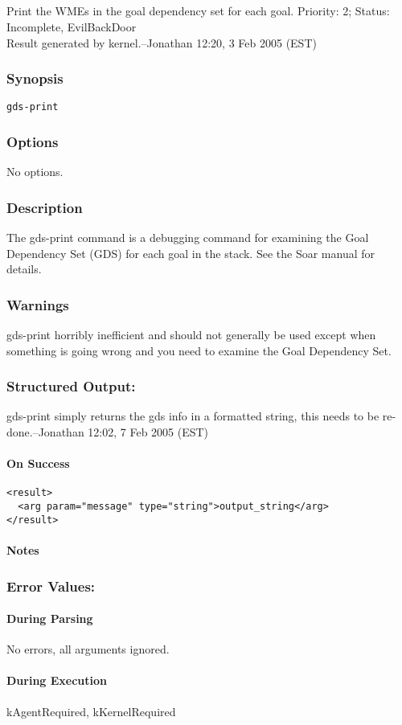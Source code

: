 \subsection{}
\label{gds-print}
Print the WMEs in the goal dependency set for each goal. 
 Priority: 2; Status: Incomplete, EvilBackDoor\\ 
Result generated by kernel.--Jonathan 12:20, 3 Feb 2005 (EST) 
\subsubsection*{Synopsis}
\begin{verbatim}
gds-print
\end{verbatim}
\subsubsection*{Options}
 No options. 
\subsubsection*{Description}
 The gds-print command is a debugging command for examining the Goal Dependency Set (GDS) for each goal in the stack. See the Soar manual for details. 
\subsubsection*{Warnings}
 gds-print horribly inefficient and should not generally be used except when something is going wrong and you need to examine the Goal Dependency Set. 
\subsubsection*{Structured Output:}
 gds-print simply returns the gds info in a formatted string, this needs to be re-done.--Jonathan 12:02, 7 Feb 2005 (EST) 
\paragraph*{On Success}
\begin{verbatim}
<result>
  <arg param="message" type="string">output_string</arg>
</result>
\end{verbatim}
\paragraph*{Notes}
\subsubsection*{Error Values:}
\paragraph*{During Parsing}
 No errors, all arguments ignored. 
\paragraph*{During Execution}
 kAgentRequired, kKernelRequired
